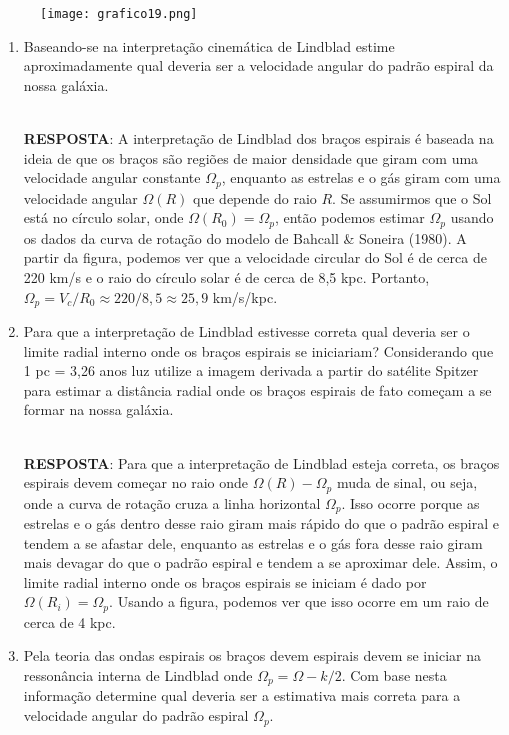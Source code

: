 \documentclass[a4paper,12pt]{article}
\begin{document}
\begin{enumerate}
\begin{figure}[H]
\centering
\texttt{[image: grafico19.png]}
\end{figure}

\begin{enumerate}
\item Baseando-se na interpretação cinemática de Lindblad estime aproximadamente qual deveria ser a velocidade angular do padrão espiral da nossa galáxia.

\noindent\hrulefill\\\textbf{RESPOSTA}: A interpretação de Lindblad dos braços espirais é baseada na ideia de que os braços são regiões de maior densidade que giram com uma velocidade angular constante $\Omega_p$, enquanto as estrelas e o gás giram com uma velocidade angular $\Omega(R)$ que depende do raio $R$. Se assumirmos que o Sol está no círculo solar, onde $\Omega(R_0) = \Omega_p$, então podemos estimar $\Omega_p$ usando os dados da curva de rotação do modelo de Bahcall \& Soneira (1980). A partir da figura, podemos ver que a velocidade circular do Sol é de cerca de 220 km/s e o raio do círculo solar é de cerca de 8,5 kpc. Portanto, $\Omega_p = V_c/R_0 \approx 220/8,5 \approx 25,9$ km/s/kpc.

\noindent\hrulefill

\item Para que a interpretação de Lindblad estivesse correta qual deveria ser o limite radial interno onde os braços espirais se iniciariam? Considerando que 1 pc = 3,26 anos luz utilize a imagem derivada a partir do satélite Spitzer para estimar a distância radial onde os braços espirais de fato começam a se formar na nossa galáxia.

\noindent\hrulefill\\\textbf{RESPOSTA}: Para que a interpretação de Lindblad esteja correta, os braços espirais devem começar no raio onde $\Omega(R) - \Omega_p$ muda de sinal, ou seja, onde a curva de rotação cruza a linha horizontal $\Omega_p$. Isso ocorre porque as estrelas e o gás dentro desse raio giram mais rápido do que o padrão espiral e tendem a se afastar dele, enquanto as estrelas e o gás fora desse raio giram mais devagar do que o padrão espiral e tendem a se aproximar dele. Assim, o limite radial interno onde os braços espirais se iniciam é dado por $\Omega(R_i) = \Omega_p$. Usando a figura, podemos ver que isso ocorre em um raio de cerca de 4 kpc.

\noindent\hrulefill

\item Pela teoria das ondas espirais os braços devem espirais devem se iniciar na ressonância interna de Lindblad onde $\Omega_p = \Omega - k/2$. Com base nesta informação determine qual deveria ser a estimativa mais correta para a velocidade angular do padrão espiral $\Omega_p$.


\end{enumerate}
\end{enumerate}
\end{document}
